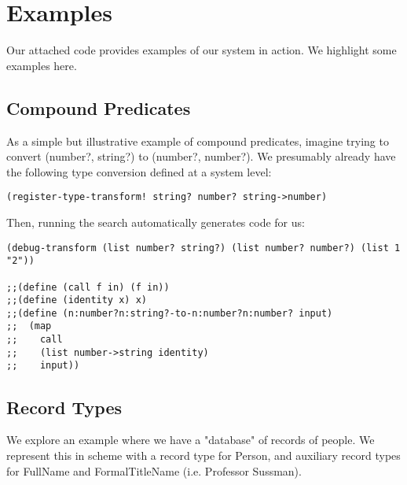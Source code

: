 \documentclass[letterpaper]{article}
\begin{document}
\section{Examples}

Our attached code provides examples of our system in action. We highlight some examples here.

\subsection{Compound Predicates}

As a simple but illustrative example of compound predicates, imagine trying to convert (number?, string?) to (number?, number?). We presumably already have the following type conversion defined at a system level:

\begin{verbatim}
(register-type-transform! string? number? string->number)
\end{verbatim}

Then, running the search automatically generates code for us:
\begin{verbatim}
(debug-transform (list number? string?) (list number? number?) (list 1 "2"))

;;(define (call f in) (f in))
;;(define (identity x) x)
;;(define (n:number?n:string?-to-n:number?n:number? input)
;;  (map 
;;    call 
;;    (list number->string identity) 
;;    input))
\end{verbatim}

\subsection{Record Types}
We explore an example where we have a "database" of records of people. We represent this in scheme with a record type for Person, and auxiliary record types for FullName and FormalTitleName (i.e. Professor Sussman).
\end{document}
